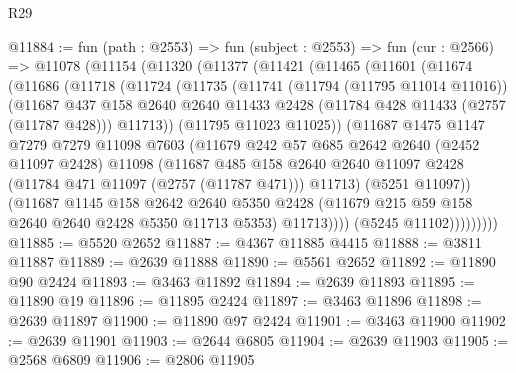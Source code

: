 \begin{lexlean}{R29}
\begin{coremodule}
@11884 := fun (path : @2553) =>
  fun (subject : @2553) =>
  fun (cur : @2566) =>
  @11078
    (@11154
      (@11320
        (@11377
          (@11421
            (@11465
              (@11601
                (@11674
                  (@11686
                    (@11718
                      (@11724
                        (@11735
                          (@11741
                            (@11794 (@11795 @11014 @11016))
                            (@11687
                              @437
                              @158
                              @2640
                              @2640
                              @11433
                              @2428
                              (@11784 @428 @11433 (@2757 (@11787 @428)))
                              @11713))
                          (@11795 @11023 @11025))
                        (@11687
                          @1475
                          @1147
                          @7279
                          @7279
                          @11098
                          @7603
                          (@11679
                            @242
                            @57
                            @685
                            @2642
                            @2640
                            (@2452 @11097 @2428)
                            @11098
                            (@11687
                              @485
                              @158
                              @2640
                              @2640
                              @11097
                              @2428
                              (@11784 @471 @11097 (@2757 (@11787 @471)))
                              @11713)
                            (@5251 @11097))
                          (@11687
                            @1145
                            @158
                            @2642
                            @2640
                            @5350
                            @2428
                            (@11679 @215 @59 @158 @2640 @2640 @2428 @5350 @11713 @5353)
                            @11713))))
                    (@5245 @11102)))))))))
@11885 := @5520 @2652
@11887 := @4367 @11885 @4415
@11888 := @3811 @11887
@11889 := @2639 @11888
@11890 := @5561 @2652
@11892 := @11890 @90 @2424
@11893 := @3463 @11892
@11894 := @2639 @11893
@11895 := @11890 @19
@11896 := @11895 @2424
@11897 := @3463 @11896
@11898 := @2639 @11897
@11900 := @11890 @97 @2424
@11901 := @3463 @11900
@11902 := @2639 @11901
@11903 := @2644 @6805
@11904 := @2639 @11903
@11905 := @2568 @6809
@11906 := @2806 @11905

\end{coremodule}
\end{lexlean}
